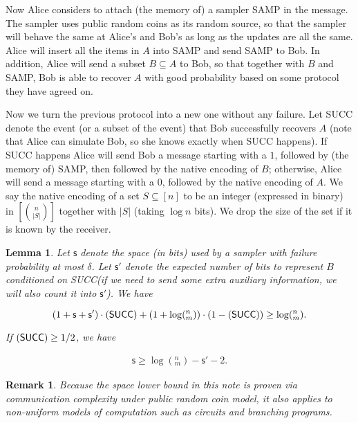 \documentclass[10pt]{article}
\let\Pr\relax
\DeclareMathOperator*{\Pr}{\mathbb{P}}
\newtheorem{lemma}{Lemma}
\newtheorem{remark}{Remark}
\newcommand{\samp}{\textsf{SAMP}\xspace}
\newcommand{\success}{\textsf{SUCC}\xspace}
\newcommand{\s}{\textsf{s}\xspace}
\begin{document}
Now Alice considers to attach (the memory of) a sampler \samp in the message. The sampler uses public random coins as its random source, so that the sampler will behave the same at Alice's and Bob's as long as the updates are all the same. Alice will insert all the items in $A$ into \samp and send \samp to Bob. In addition, Alice will send a subset $B\subseteq A$ to Bob, so that together with $B$ and \samp, Bob is able to recover $A$ with good probability based on some protocol they have agreed on. 
 
Now we turn the previous protocol into a new one without any failure. Let \success denote the event (or a subset of the event) that Bob successfully recovers $A$ (note that Alice can simulate Bob, so she knows exactly when \success happens). If \success happens Alice will send Bob a message starting with a $1$, followed by (the memory of) \samp, then followed by the native encoding of $B$; otherwise, Alice will send a message starting with a $0$, followed by the native encoding of $A$. We say the native encoding of a set $S\subseteq [n]$ to be an integer (expressed in binary) in $[{n \choose |S|}]$ together with $|S|$ (taking $\log n$ bits). We drop the size of the set if it is known by the receiver.

\begin{lemma} \label{lemma:lb-meta}
  Let $\s$ denote the space (in bits) used by a sampler with failure probability at most $\delta$. Let $\s'$ denote the expected number of bits to represent $B$ conditioned on \success (if we need to send some extra auxiliary information, we will also count it into $\s'$). We have 
  
  $$(1+\s+\s')\cdot \Pr(\success)+(1+\log (^n_m)) \cdot (1-\Pr(\success)) \ge \log (^n_m).$$
  
  If $\Pr(\success)\ge 1/2$, we have 
  
  \begin{align} \label{formula:lb-meta}
  \s\ge \log (^n_m) - \s' - 2.
  \end{align} 
\end{lemma}

\begin{remark}
  Because the space lower bound in this note is proven via communication complexity under public random coin model, it also applies to non-uniform models of computation such as circuits and branching programs.  
\end{remark}

\end{document}
